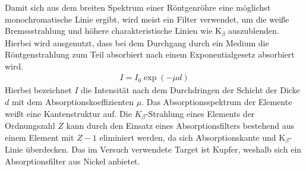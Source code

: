 \documentclass[a4paper,twoside,final]{article}
\begin{document}
Damit sich aus dem breiten Spektrum einer Röntgenröhre eine möglichst monochromatische Linie ergibt, wird meist ein Filter verwendet, um die weiße Bremssstrahlung und höhere charakteristische Linien wie K$_\beta$ auszublenden. Hierbei wird ausgenutzt, dass bei dem Durchgang durch ein Medium die Röntgenstrahlung zum Teil absorbiert nach einem Exponentialgesetz absorbiert wird.
\begin{align}
  I = I_0 \exp(-\mu d)
\end{align}
Hierbei bezeichnet $I$ die Intensität nach dem Durchdringen der Schicht der Dicke $d$ mit dem Absorptionskoeffizienten $\mu$. Das Absorptionsspektrum der Elemente weißt eine Kantenstruktur auf. Die $K_\beta$-Strahlung eines Elements der Ordnungszahl $Z$ kann durch den Einsatz eines Absorptionsfilters bestehend aus einem Element mit $Z-1$ eliminiert werden, da sich Absorptionskante und K$_\beta$-Linie überdecken. Das im Versuch verwendete Target ist Kupfer, weshalb sich ein Absorptionsfilter aus Nickel anbietet.
\end{document}
